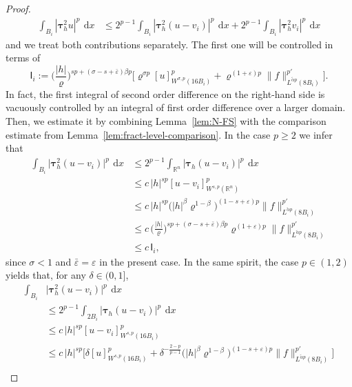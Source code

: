 \documentclass[10pt,letterpaper]{amsart}
\theoremstyle{definition}
\numberwithin{theorem}{section}
\numberwithin{equation}{section}
\newcommand{\1}{\ensuremath{\mathds{1}}}
\newcommand\sfI{{\boldsymbol{\mathsf I}}}
\renewcommand{\epsilon}{\varepsilon}
\renewcommand{\rho}{\varrho}
\renewcommand{\epsilon}{\varepsilon}
\renewcommand{\rho}{\varrho}
\renewcommand{\d}{\:\! \mathrm{d}}
\numberwithin{equation}{section}
\begin{document}
\begin{proof}
\begin{align}
    \int_{B_i} |\boldsymbol\tau_h^2 u|^p \,\d x
    &\le
    2^{p-1}\int_{B_i} |\boldsymbol\tau_h^2 (u - v_i)|^p \,\d x
    + 2^{p-1}\int_{B_i} |\boldsymbol\tau_h^2 v_i|^p \,\d x 
\end{align}
and we treat both contributions separately. The first one will be controlled in terms of 
\begin{equation}\label{def:Ii}
    \sfI_i
    :=
    \Big(\frac{|h|}{\rho}\Big)^{sp+(\sigma-s+\bar\epsilon)\beta p} 
    \Big[ \rho^{\sigma p} [u]_{W^{\sigma,p}(16B_i)}^p +
    \rho^{(1+\epsilon)p}
    \|f\|_{L^{\tilde\alpha p}(8B_i)}^{p'}\Big]. 
\end{equation}
In fact, the first integral of second order difference on the right-hand side is vacuously controlled by an integral of first order difference over a larger domain. Then, we estimate it by combining
Lemma~\ref{lem:N-FS} with the comparison estimate from
Lemma~\ref{lem:fract-level-comparison}.
In the case $p\ge 2$ we infer that  
\begin{align}\label{change-1}
    \int_{B_i} \big|\boldsymbol\tau_h^2 (u - v_i)\big|^p \,\d x
    &\le
    2^{p-1}\int_{\mathbb{R}^n} \big|\boldsymbol\tau_h (u - v_i)\big|^p \,\d x \nonumber\\
    &\le
    c\, |h|^{sp} [u-v_i]_{W^{s,p}(\mathbb{R}^n)}^p \nonumber\\
    &\le
    c\, |h|^{sp} \big(|h|^\beta\rho^{1-\beta}\big)^{(1-s+\epsilon)p}
    \|f\|_{L^{\tilde\alpha p}(8B_i)}^{p'} \nonumber\\
    &\le 
    c\, \Big(\frac{|h|}{\rho}\Big)^{sp+(\sigma-s+\bar\epsilon)\beta p} \rho^{(1+\epsilon)p}
    \|f\|_{L^{\tilde\alpha p}(8B_i)}^{p'} \nonumber\\
    &\le  
    c\,\sfI_i ,
\end{align}
since $\sigma<1$ and $\bar\varepsilon=\varepsilon$ in the present case.
In the same spirit, the case $p\in(1,2)$ yields that, for any $\delta\in(0,1]$,
\begin{align*}
    \int_{B_i} & \big|\boldsymbol\tau_h^2 (u - v_i)\big|^p \,\d x\\
    &\le
    2^{p-1}\int_{2B_i} \big|\boldsymbol\tau_h (u - v_i)\big|^p \,\d x \nonumber\\
    &\le
    c\, |h|^{sp} [u-v_i]_{W^{s,p}(16 B_i)}^p\nonumber\\
    &\le
    c\, |h|^{sp} \Big[\delta[u]_{W^{s,p}(16B_i)}^p +
    \delta^{-\frac{2-p}{p-1}} \big(|h|^\beta\rho^{1-\beta}\big)^{(1-s+\epsilon)p}
    \|f\|_{L^{\tilde\alpha p}(8B_i)}^{p'}\Big] \nonumber\\

\end{align*}
\end{proof}
\end{document}
